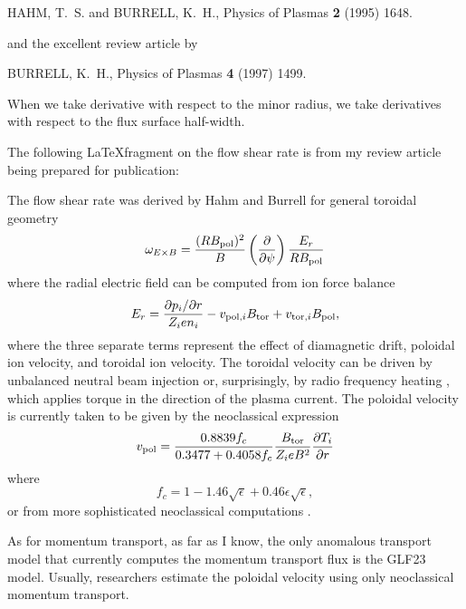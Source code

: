 

\begin{thebibliography}{99}
HAHM, T.~S. and BURRELL, K.~H.,
\newblock Physics of Plasmas {\bf 2} (1995) 1648.

and the excellent review article by

BURRELL, K.~H.,
\newblock Physics of Plasmas {\bf 4} (1997) 1499.
\end{thebibliography}

        When we take derivative with respect to the minor radius,
we take derivatives with respect to the flux surface half-width.

        The following \LaTeX fragment on the flow shear rate
is from my review article being prepared for publication:

The flow shear rate was derived by Hahm and Burrell \cite{hahm95a}
for general toroidal geometry
\begin{equation}
\omega_{E \times B} = \frac{ (R B_{\rm pol})^2}{B}
  \left( \frac{\partial}{\partial \psi} \right)
  \frac{E_r}{R B_{\rm pol}}
\end{equation}
where the radial electric field can be computed from ion force balance
\begin{equation}
E_r = \frac{ \partial p_i / \partial r }{ Z_i e n_i }
  - v_{{\rm pol,}i } B_{\rm tor} + v_{{\rm tor,}i } B_{\rm pol},
\end{equation}
where the three separate terms represent the effect of diamagnetic drift,
poloidal ion velocity, and toroidal ion velocity.
The toroidal velocity can be driven by unbalanced neutral beam injection
\cite{bath97a,erba99b} 
or, surprisingly, by radio frequency heating 
\cite{chang98a,coppi98a}, which applies torque in the direction of the
plasma current.
The poloidal velocity is currently taken to be given by the neoclassical
expression \cite{staebler97a}
\begin{equation}
v_{\rm pol} = \frac{0.8839 f_c}{0.3477 + 0.4058 f_c}
\frac{B_{\rm tor}}{Z_i e B^2} \frac{\partial T_i}{\partial r}
\end{equation}
where
\[ f_c = 1 - 1.46 \sqrt{\epsilon} + 0.46 \epsilon \sqrt{\epsilon}, \]
or from more sophisticated neoclassical computations
\cite{www-nclass,zhu99a}.

        As for momentum transport, as far as I know, the only anomalous 
transport model that currently computes the momentum transport flux is 
the GLF23 model.  Usually, researchers estimate the poloidal velocity
using only neoclassical momentum transport.



